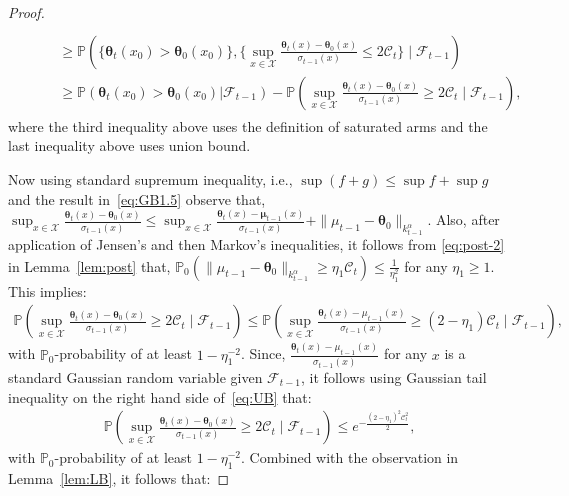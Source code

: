 \documentclass[final,12pt]{colt2026} %
\begin{document}
\begin{proof}
\begin{align}
\begin{split}
    \\
    &\qquad \geq  \mathbb{P}\left( \{  \pmb \theta_t(x_0) > \pmb \theta_0(x_0)   \} , \{\sup_{x\in\mathcal X} \frac{\pmb\theta_t(x)-\pmb \theta_0(x)}{\sigma_{t-1}(x)}   \leq 2 \mathcal{C}_t \} \mid \mathcal{F}_{t-1} \right)\\
    &\qquad \geq \mathbb{P} \left(\pmb \theta_t(x_0) > \pmb \theta_0(x_0)  | \mathcal{F}_{t-1} \right)  -  \mathbb{P}\left(\sup_{x\in\mathcal X} \frac{\pmb\theta_t(x)-\pmb \theta_0(x)}{\sigma_{t-1}(x)}   \geq 2 \mathcal{C}_t  \mid \mathcal{F}_{t-1} \right),    
\end{split}
\end{align}
where the third inequality above uses the definition of saturated arms and the last inequality above uses union bound. 

Now using standard supremum inequality, i.e., $\sup(f+g) \le \sup f +\sup g $ and the result in~\eqref{eq:GB1.5} observe that,
\( \sup_{x\in\mathcal X} \frac{\pmb\theta_t(x)-\pmb \theta_0(x)}{\sigma_{t-1}(x)} \le  \sup_{x\in\mathcal X} \frac{\pmb\theta_t(x)-\pmb \mu_{t-1}(x)}{\sigma_{t-1}(x)} + \|\mu_{t-1}-\pmb \theta_0\|_{k_{t-1}^{\alpha}}. \) Also, after application of Jensen's and then Markov's inequalities, it follows from \eqref{eq:post-2} in Lemma~\ref{lem:post} 
that, $\mathbb{P}_0(\|\mu_{t-1}-\pmb \theta_0\|_{k_{t-1}^{\alpha}} \geq \eta_1 \mathcal{C}_t ) \leq \frac{1}{\eta_1^2}$ for any $\eta_1\geq 1$.  This implies:
\begin{align}
\mathbb{P}\left(\sup_{x\in\mathcal X} \frac{\pmb\theta_t(x)-\pmb \theta_0(x)}{\sigma_{t-1}(x)}   \geq 2 \mathcal{C}_t\;\Big|\;\mathcal{F}_{t-1} \right) \leq \mathbb{P}\left( \sup_{x\in\mathcal X} \frac{\pmb\theta_t(x)-\mu_{t-1}(x)}{\sigma_{t-1}(x)}   \geq (2-\eta_1) \mathcal{C}_t\;\Big|\;\mathcal{F}_{t-1} \right),
\label{eq:UB}
\end{align}
with $\mathbb{P}_0$-probability of at least $1-\eta_1^{-2}$.
Since, $\frac{\pmb\theta_t(x)-\mu_{t-1}(x)}{\sigma_{t-1}(x)}$ for any $x$ is a standard Gaussian random variable given $\mathcal{F}_{t-1}$, it follows using Gaussian tail inequality on the right hand side of~\eqref{eq:UB} that:
\begin{align}
\mathbb{P}\left(\sup_{x\in\mathcal X} \frac{\pmb\theta_t(x)-\pmb \theta_0(x)}{\sigma_{t-1}(x)}   \geq 2 \mathcal{C}_t\;\Big|\;\mathcal{F}_{t-1} \right) \leq e^{-\frac{(2-\eta_1)^2 \mathcal{C}_t^2}{2}},
\end{align}
with $\mathbb{P}_0$-probability of at least $1-\eta_1^{-2}$.
Combined with the observation in Lemma~\ref{lem:LB}, it follows that:

\end{proof}
\end{document}
